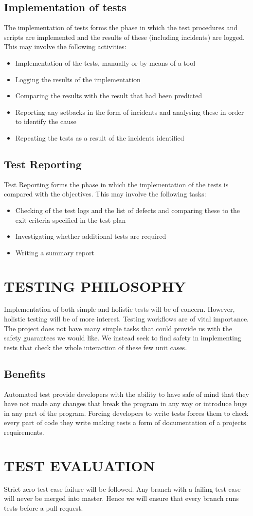 \documentclass[12pt]{article}
\begin{document}
\subsection{Implementation of tests}
The implementation of tests forms the phase in which the test procedures and scripts are implemented and the results of these (including incidents) are logged. This may involve the following activities: \newline
\begin{itemize}
 \item Implementation of the tests, manually or by means of a tool  
\item Logging the results of the implementation 
\item Comparing the results with the result that had been predicted 
\item Reporting any setbacks in the form of incidents and analysing these in order to identify the cause 
\item Repeating the tests as a result of the incidents identified 
\end{itemize}
\subsection{Test Reporting}
Test Reporting forms the phase in which the implementation of the tests is compared with the objectives. This may involve the following tasks: \newline
\begin{itemize}
 \item Checking of the test logs and the list of defects and comparing these to the exit criteria specified in the test plan   
\item Investigating whether additional tests are required
\item Writing a summary report 
\end{itemize}
  \section{TESTING PHILOSOPHY}
  Implementation of both simple and holistic tests will be of concern. However, holistic testing will be of more interest. Testing workflows are of vital importance. The project does not have many simple tasks that could provide us with the safety guarantees we would like. We instead seek to find safety in implementing tests that check the whole interaction of these few unit cases.
  
  \subsection{Benefits}
  Automated test provide developers with the ability to have safe of mind that they have not made any changes that break the program in any way or introduce bugs in any part of the program.
  Forcing developers to write tests forces them to check every part of code they write making tests a form of documentation of a projects requirements.
  
  \section{TEST EVALUATION}
  Strict zero test case failure will be followed. Any branch with a failing test case will never be merged into master. Hence we will ensure that every branch runs tests before a pull request.
  
\end{document}
